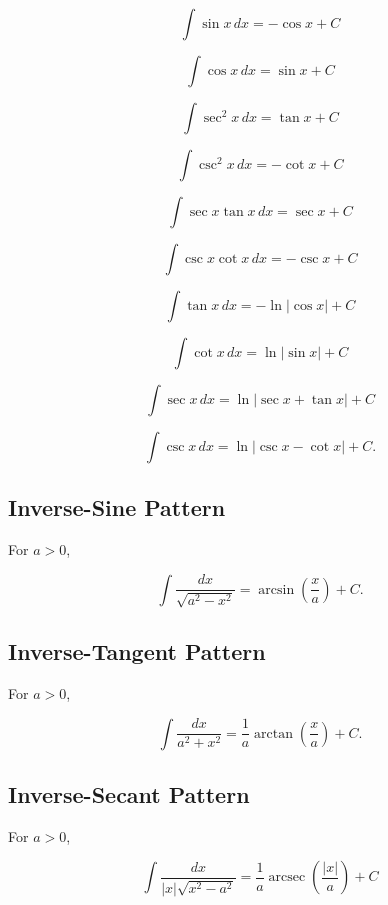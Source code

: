 \[
\boxed{
\int\sin x\,dx
=
-\cos x+C
}
\]

\[
\boxed{
\int\cos x\,dx
=
\sin x+C
}
\]

\[
\boxed{
\int\sec^2x\,dx
=
\tan x+C
}
\]

\[
\boxed{
\int\csc^2x\,dx
=
-\cot x+C
}
\]

\[
\boxed{
\int\sec x\tan x\,dx
=
\sec x+C
}
\]

\[
\boxed{
\int\csc x\cot x\,dx
=
-\csc x+C
}
\]

\[
\boxed{
\int\tan x\,dx
=
-\ln|\cos x|+C
}
\]

\[
\boxed{
\int\cot x\,dx
=
\ln|\sin x|+C
}
\]

\[
\boxed{
\int\sec x\,dx
=
\ln|\sec x+\tan x|+C
}
\]

\[
\boxed{
\int\csc x\,dx
=
\ln|\csc x-\cot x|+C.
}
\]

\subsection{Inverse-Sine Pattern}
\label{subsec:inverse-sine-integral-pattern}

For \(a>0\),

\[
\boxed{
\int
\frac{
dx
}{
\sqrt{a^2-x^2}
}
=
\arcsin
\left(
\frac{x}{a}
\right)
+
C.
}
\]

\subsection{Inverse-Tangent Pattern}
\label{subsec:inverse-tangent-integral-pattern}

For \(a>0\),

\[
\boxed{
\int
\frac{
dx
}{
a^2+x^2
}
=
\frac1a
\arctan
\left(
\frac{x}{a}
\right)
+
C.
}
\]

\subsection{Inverse-Secant Pattern}
\label{subsec:inverse-secant-integral-pattern}

For \(a>0\),

\[
\boxed{
\int
\frac{
dx
}{
|x|\sqrt{x^2-a^2}
}
=
\frac1a
\operatorname{arcsec}
\left(
\frac{|x|}{a}
\right)
+
C
}
\]

